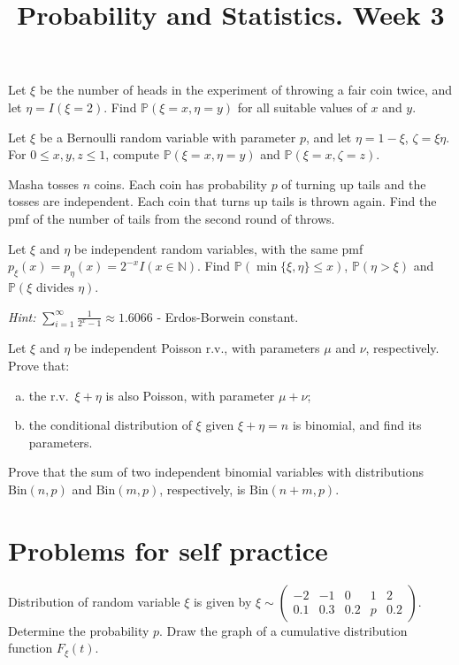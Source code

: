 \documentclass[14pt]{exam}
\title{Probability and Statistics. Week 3}
\date{}
\newcommand{\PP}{{\ensuremath{\mathbb{P}}}}
\newcommand{\N}{{\ensuremath{\mathbb{N}}}}
\begin{document}
	\maketitle
	
	
	\begin{questions}
		\question
		Let \(\xi\) be the number of heads in the experiment of throwing a fair coin twice, and let \(\eta = I(\xi =2)\). Find \(\PP(\xi=x,\eta =y)\) for all suitable values of \(x\) and \(y\).


		\question
		Let \(\xi\) be a Bernoulli random variable with parameter \(p\), and let \(\eta = 1-\xi\), \(\zeta = \xi\eta\). For \(0\leq x, y, z \leq 1\), compute \(\PP(\xi = x, \eta =y)\) and \(\PP(\xi = x, \zeta = z)\).

		\question
		Masha tosses \(n\) coins. Each coin has probability \(p\) of turning up tails and the tosses are independent. Each coin that turns up tails is thrown again. Find the pmf of the number of tails from the second round of throws.


		\question
  		Let \(\xi\) and \(\eta\) be independent random variables, with the same pmf \(p_{\xi}(x) = p_{\eta}(x) = 2^{-x}I(x \in \N)\). Find \(\PP(\min\{\xi,\eta\}\leq x)\), \(\PP(\eta > \xi)\) and \(\PP(\xi \textrm{ divides } \eta)\).
  		
  		\textit{Hint:} $\sum_{i=1}^\infty \frac{1}{2^x - 1} \approx 1.6066$ - Erdos-Borwein constant.


		\question
		Let \(\xi\) and \(\eta\) be independent Poisson r.v., with parameters \(\mu\) and \(\nu\), respectively. Prove that:
		\begin{enumerate}[(a)]
		  \item the r.v.~\(\xi+\eta\) is also Poisson, with parameter \(\mu+\nu\);
		  \item the conditional distribution of \(\xi\) given \(\xi+\eta =n\) is
		  binomial, and find its parameters.
		\end{enumerate}

		\question
		Prove that the sum of two independent binomial variables
with distributions \(\textrm{Bin}(n,p)\) and \(\textrm{Bin}(m,p)\), 
respectively, is \(\textrm{Bin}(n+m,p)\).	
	
		\section*{Problems for self practice}
		\question
		Distribution of random variable $\xi$ is given by $\xi \sim \begin{pmatrix}
			-2 & -1 & 0 & 1 & 2\\
			0.1 & 0.3 & 0.2 & p & 0.2
		\end{pmatrix}$. Determine the probability $p$. Draw the graph of a cumulative distribution function $F_\xi(t)$.
		




\end{questions}
\end{document}
